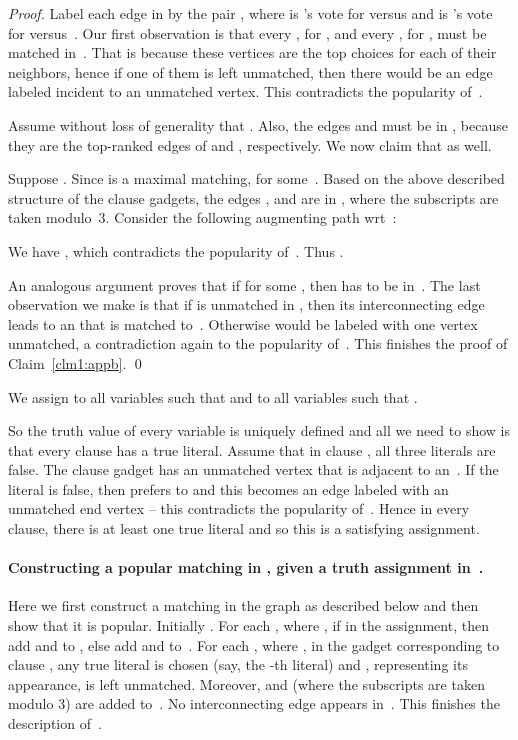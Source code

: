 \documentclass[11pt]{llncs}
\begin{document}
\begin{proof}
Label each edge  in  by the pair , where  is 's vote for  versus  and 
 is 's vote for  versus~. Our first observation is that every , for , and every 
, for , must be matched in~. That is because these vertices are the top choices for each of their neighbors, 
hence if one of them is left unmatched, then there would be an edge labeled  incident to an unmatched vertex. This contradicts the 
popularity of~.
 
Assume without loss of generality that .  Also, the edges  and
 must be in , because they are the top-ranked edges of  and , respectively. We now claim
that  as well. 

Suppose . Since  is a maximal matching,  
for some~. Based on the above described structure of the clause gadgets, the edges , and 
 are in , where the subscripts are taken modulo~3. 
Consider the following augmenting path  wrt~: 

We have , which contradicts the
popularity of~. Thus . 

An analogous argument proves that if  for some , then  has to be in~. 
The last observation we make is that if  is unmatched in , then its interconnecting edge leads to an   
that is matched to~. Otherwise  would be labeled  with one vertex unmatched, a contradiction 
again to the popularity of~. This finishes the proof of Claim~\ref{clm1:appb}. \qed
\end{proof}

We assign  to all variables  such that  and 
 to all variables  such that .

So the truth value of every variable is uniquely defined and all we need to show is that every clause has a true literal. Assume that in clause , all three 
literals are false. The clause gadget has an unmatched vertex  that is adjacent to an~. If the literal is false, 
then  prefers  to  and this becomes an edge labeled  with an unmatched end vertex -- this 
contradicts the popularity of~. Hence in every clause, there is at least one true literal and so this is a satisfying assignment.








\paragraph{Constructing a popular matching in , given a truth assignment in~.}
Here we first construct a matching  in the graph  as described below and then show that it is popular. Initially .
For each , where , if  in the assignment, then add  and  to , 
else add  and  to~. 
For each , where , in the gadget corresponding to clause , any true literal is chosen (say, the -th literal) and 
, representing its appearance, is left unmatched. Moreover,  and  (where
the subscripts are taken modulo 3) are added to~. No interconnecting edge appears in~. This finishes the description of~.
\end{document}
